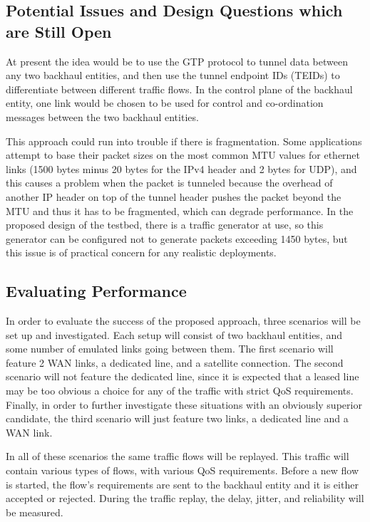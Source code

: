 \subsection{Potential Issues and Design Questions which are Still Open}

At present the idea would be to use the GTP protocol to tunnel data between any two backhaul entities, and then use the tunnel endpoint IDs (TEIDs) to differentiate between different traffic flows. In the control plane of the backhaul entity, one link would be chosen to be used for control and co-ordination messages between the two backhaul entities.

This approach could run into trouble if there is fragmentation. Some applications attempt to base their packet sizes on the most common MTU values for ethernet links (1500 bytes  minus 20 bytes for the IPv4 header and 2 bytes for UDP), and this causes a problem when the packet is tunneled because the overhead of another IP header on top of the tunnel header pushes the packet beyond the MTU and thus it has to be fragmented, which can degrade performance. In the proposed design of the testbed, there is a traffic generator at use, so this generator can be configured not to  generate packets exceeding 1450 bytes, but this issue is of practical concern for any realistic deployments.

\subsection{Evaluating Performance}

In order to evaluate the success of the proposed approach, three scenarios will be set up and investigated. Each setup will consist of two backhaul entities, and some number of emulated links going between them. The first scenario will feature 2 WAN links, a dedicated line, and a satellite connection. The second scenario will not feature the dedicated line, since it is expected that a leased line may be too obvious a choice for any of the traffic with strict QoS requirements. Finally, in order to further investigate these situations with an obviously superior candidate, the third scenario will just feature two links, a dedicated line and a WAN link.

In all of these scenarios the same traffic flows will be replayed. This traffic will contain various types of flows, with various QoS requirements. Before a new flow is started, the flow's requirements are sent to the backhaul entity and it is either accepted or rejected. During the traffic replay, the delay, jitter, and reliability will be measured.

